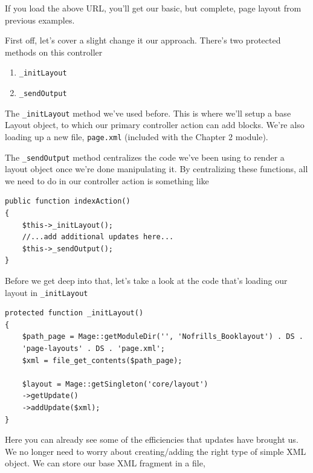 \documentclass[oneside]{book}
\begin{document}
If you load the above URL, you'll get our basic, but complete, page layout from previous examples. 

First off, let's cover a slight change it our approach. There's two protected methods on this controller

\begin{enumerate}
\item \footnotesize\texttt{\_initLayout} \normalsize 
\item \footnotesize\texttt{\_sendOutput} \normalsize 
\end{enumerate}


The \footnotesize\texttt{\_initLayout} \normalsize  method we've used before.  This is where we'll setup a base Layout object, to which our primary controller action can add blocks.  We're also loading up a new file, \footnotesize\texttt{page.xml} \normalsize  (included with the Chapter 2 module). 

The \footnotesize\texttt{\_sendOutput} \normalsize  method centralizes the code we've been using to render a layout object once we're done manipulating it.  By centralizing these functions, all we need to do in our controller action is something like 

\begin{lstlisting}
public function indexAction()
{
    $this->_initLayout();       
    //...add additional updates here...     
    $this->_sendOutput();
}

\end{lstlisting}


Before we get deep into that, let's take a look at the code that's loading our layout in \footnotesize\texttt{\_initLayout} \normalsize 

\begin{lstlisting}
protected function _initLayout()
{
    $path_page = Mage::getModuleDir('', 'Nofrills_Booklayout') . DS . 
    'page-layouts' . DS . 'page.xml';                           
    $xml = file_get_contents($path_page);   

    $layout = Mage::getSingleton('core/layout')
    ->getUpdate()
    ->addUpdate($xml);          
}

\end{lstlisting}


Here you can already see some of the efficiencies that updates have brought us.  We no longer need to worry about creating/adding the right type of simple XML object.  We can store our base XML fragment in a file, 
\end{document}
